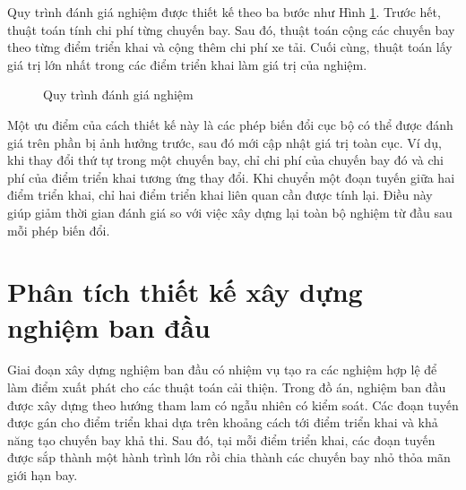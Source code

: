 Quy trình đánh giá nghiệm được thiết kế theo ba bước như Hình \ref{fig:chapter4-evaluation-flow}. Trước hết, thuật toán tính chi phí từng chuyến bay. Sau đó, thuật toán cộng các chuyến bay theo từng điểm triển khai và cộng thêm chi phí xe tải. Cuối cùng, thuật toán lấy giá trị lớn nhất trong các điểm triển khai làm giá trị của nghiệm.

\begin{figure}[H]
\centering
{}
\caption{Quy trình đánh giá nghiệm}
\label{fig:chapter4-evaluation-flow}
\end{figure}

Một ưu điểm của cách thiết kế này là các phép biến đổi cục bộ có thể được đánh giá trên phần bị ảnh hưởng trước, sau đó mới cập nhật giá trị toàn cục. Ví dụ, khi thay đổi thứ tự trong một chuyến bay, chỉ chi phí của chuyến bay đó và chi phí của điểm triển khai tương ứng thay đổi. Khi chuyển một đoạn tuyến giữa hai điểm triển khai, chỉ hai điểm triển khai liên quan cần được tính lại. Điều này giúp giảm thời gian đánh giá so với việc xây dựng lại toàn bộ nghiệm từ đầu sau mỗi phép biến đổi.

\section{Phân tích thiết kế xây dựng nghiệm ban đầu}

Giai đoạn xây dựng nghiệm ban đầu có nhiệm vụ tạo ra các nghiệm hợp lệ để làm điểm xuất phát cho các thuật toán cải thiện. Trong đồ án, nghiệm ban đầu được xây dựng theo hướng tham lam có ngẫu nhiên có kiểm soát. Các đoạn tuyến được gán cho điểm triển khai dựa trên khoảng cách tới điểm triển khai và khả năng tạo chuyến bay khả thi. Sau đó, tại mỗi điểm triển khai, các đoạn tuyến được sắp thành một hành trình lớn rồi chia thành các chuyến bay nhỏ thỏa mãn giới hạn bay.

